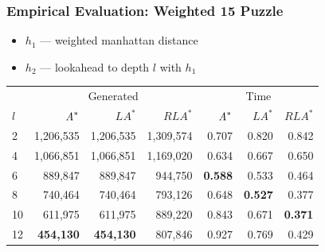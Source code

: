\documentclass{beamer}
\newcommand{\lazyastar} {\ensuremath{LA^\ast}}
\newcommand{\rationallazyastar} {\ensuremath{RLA^\ast}}
\begin{document}
\begin{frame}
\frametitle{Empirical Evaluation: Weighted 15 Puzzle}

\begin{itemize}
  \item $h_1$ --- weighted manhattan distance
  \item $h_2$ --- lookahead to depth $l$ with $h_1$
\end{itemize}

\begin{tabular}{|l|r|r|r||r|r|r|}
\hline
    & \multicolumn{3}{|c|}{Generated } & \multicolumn{3}{|c|}{Time }\\
$l$ &	 $\text{\it A}^{\ast}$ & \lazyastar & \rationallazyastar &	 $\text{\it A}^{\ast}$ & \lazyastar
& \rationallazyastar\\
\hline
2 	& 1,206,535 & 	 1,206,535 &	 1,309,574 &	 0.707 & 	 0.820& 	 0.842 \\ 
\hline
4 	& 1,066,851 & 	 1,066,851 &	 1,169,020 &	 0.634 &	 0.667& 	 0.650 \\ 
\hline
6 	& 889,847 &	 889,847 &	 944,750 &	 {\bf 0.588} &	 0.533 &	 0.464 \\ 
\hline
8 	& 740,464 &	 740,464 &	 793,126 &	 0.648 &	 {\bf 0.527} &	 0.377 \\ 
\hline
10 	& 611,975 &	 611,975 &	 889,220 &	 0.843 &	 0.671 	& {\bf 0.371} \\ 
\hline
12 	& {\bf 454,130} &	 {\bf 454,130} &	 807,846 &	 0.927 &	 0.769 &	 0.429 \\
\hline
\end{tabular}

\end{frame}
\end{document}
